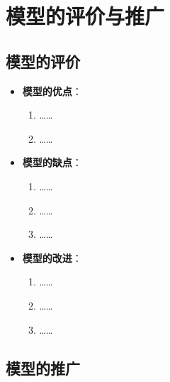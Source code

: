 \documentclass{MathorCupModeling}
\begin{document}
	\section{模型的评价与推广}
	
	\subsection{模型的评价}
	\begin{itemize}
		\item \textbf{模型的优点}：
			\begin{enumerate}
				\item ……
				\item ……
			\end{enumerate}
		\item \textbf{模型的缺点}：
			\begin{enumerate}
				\item ……
				\item ……
				\item ……
			\end{enumerate}
		\item \textbf{模型的改进}：
			\begin{enumerate}
				\item ……
				\item ……
				\item ……
			\end{enumerate}
	\end{itemize}
	\subsection{模型的推广}
\end{document}
